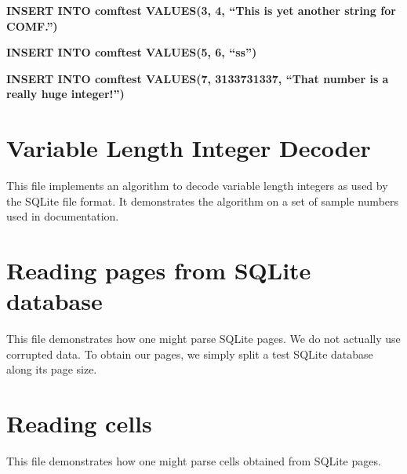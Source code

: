 \documentclass{article}
\begin{document}
\noindent\textbf{INSERT INTO comftest VALUES(3, 4, ``This is yet another string for COMF.'')}

\noindent\textbf{INSERT INTO comftest VALUES(5, 6, ``ss'')}

\noindent\textbf{INSERT INTO comftest VALUES(7, 3133731337, ``That number is a really huge integer!'')}


\section{Variable Length Integer Decoder}
This file implements an algorithm to decode variable length integers as used by the SQLite file format. It demonstrates the algorithm on a set of sample numbers used in documentation.


\section{Reading pages from SQLite database}
This file demonstrates how one might parse SQLite pages. We do not actually use corrupted data. To obtain our pages, we simply split a test SQLite database along its page size.


\section{Reading cells}
This file demonstrates how one might parse cells obtained from SQLite pages.


\nocite{*}
\renewcommand\refname{References and Reading List}


\end{document}
